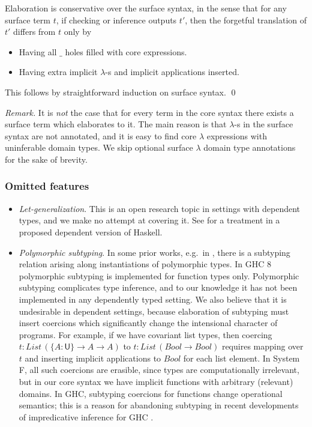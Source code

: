 \documentclass[acmsmall,review,anonymous,prologue,dvipsnames]{acmart}\settopmatter{printfolios=true,printccs=false,printacmref=false}
\renewcommand{\U}{\mathsf{U}}
\theoremstyle{remark}
\begin{document}
\begin{theorem}[Conservativity]\label{thm:conservativity}
Elaboration is conservative over the surface syntax, in the sense that for any
surface term $t$, if checking or inference outputs $t'$, then the forgetful
translation of $t'$ differs from $t$ only by
  \begin{itemize}
    \item Having all $\_$ holes filled with core expressions.
    \item Having extra implicit $\lambda$-s and implicit applications inserted.
  \end{itemize}
This follows by straightforward induction on surface syntax. \qed
\end{theorem}

\emph{Remark.} It is \emph{not} the case that for every term in the core syntax
there exists a surface term which elaborates to it. The main reason is that
$\lambda$-s in the surface syntax are not annotated, and it is easy to find core
$\lambda$ expressions with uninferable domain types. We skip optional surface
$\lambda$ domain type annotations for the sake of brevity.

\subsubsection{Omitted features}

\begin{itemize}
  \item \emph{Let-generalization}. This is an open research topic in settings
    with dependent types, and we make no attempt at covering it. See
    \cite{eisenberg2016dependent} for a treatment in a proposed dependent
    version of Haskell.
  \item \emph{Polymorphic subtyping}. In some prior works, e.g.\ in
    \cite{dunfield2013complete, vytiniotis2008fph}, there is a subtyping
    relation arising along instantiations of polymorphic types. In GHC 8
    polymorphic subtyping is implemented for function types only. Polymorphic
    subtyping complicates type inference, and to our knowledge it has not been
    implemented in any dependently typed setting. We also believe that it is
    undesirable in dependent settings, because elaboration of subtyping must
    insert coercions which significantly change the intensional character of
    programs. For example, if we have covariant list types, then coercing $t :
    List\,(\{A : \U\}\to A \to A)$ to $t : List\,(Bool \to Bool)$ requires
    mapping over $t$ and inserting implicit applications to $Bool$ for each list
    element. In System F, all such coercions are erasible, since types are
    computationally irrelevant, but in our core syntax we have implicit
    functions with arbitrary (relevant) domains. In GHC, subtyping coercions for
    functions change operational semantics; this is a reason for abandoning
    subtyping in recent developments of impredicative inference for GHC
    \cite{serrano2020a}.
\end{itemize}
\end{document}
